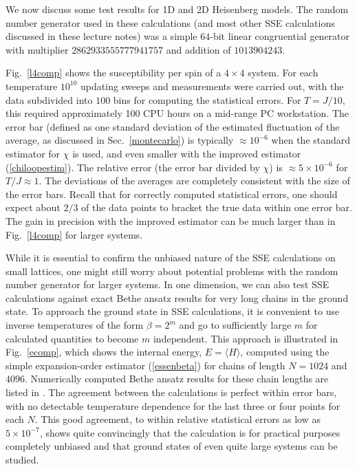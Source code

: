 \documentclass[draft,numberedheadings]{aipproc}
\begin{document}
We now discuss some test results for 1D and 2D Heisenberg models. The random number generator used in these calculations (and most other SSE calculations 
discussed  in these lecture notes) was a simple $64$-bit linear congruential generator with multiplier $2862933555777941757$ \cite{knuth88} and addition of
$1013904243$.

Fig.~\ref{l4comp} shows the susceptibility per spin of a $4\times 4$ system. For each temperature $10^{10}$ updating sweeps and measurements were carried
out, with the data subdivided into $100$ bins for computing the statistical errors. For $T=J/10$, this required approximately 100 CPU hours on a mid-range PC
workstation. The error bar (defined as one standard deviation of the estimated fluctuation of the average, as discussed in Sec.~\ref{montecarlo}) is typically 
$\approx 10^{-6}$ when the standard estimator for $\chi$ is used, and even smaller with the improved estimator (\ref{chiloopestim}). The relative error (the 
error bar divided by $\chi$) is $\approx 5\times 10^{-6}$ for $T/J\approx 1$. The deviations of the averages are completely consistent with the size of the 
error bars. Recall that for correctly computed statistical errors, one should expect about $2/3$ of the data points to bracket the true data within one 
error bar. The gain in precision with the improved estimator can be much larger than in Fig.~\ref{l4comp} for larger systems.

While it is essential to confirm the unbiased nature of the SSE calculations on small lattices, one might still worry about potential problems with the random number
generator for larger systems. In one dimension, we can also test SSE calculations against exact Bethe ansatz results for very long chains in the ground state. 
To approach the ground state in SSE calculations, it is convenient to use inverse temperatures of the form $\beta=2^m$ and go to sufficiently large $m$ for 
calculated quantities to become $m$ independent. This approach is illustrated in Fig.~\ref{ecomp}, which shows the internal energy, $E=\langle H\rangle$, computed 
using the simple expansion-order estimator (\ref{essenbeta}) for chains of length $N=1024$ and $4096$. Numerically computed Bethe ansatz results for these chain 
lengths are listed in \cite{karbach98}. The agreement between the calculations is perfect within error bars, with no detectable temperature dependence for the 
last three or four points for each $N$. This good agreement, to within relative statistical errors as low as $5\times 10^{-7}$, shows quite convincingly that
the calculation is for practical purposes completely unbiased and that ground states of even quite large systems can be studied.
\end{document}

